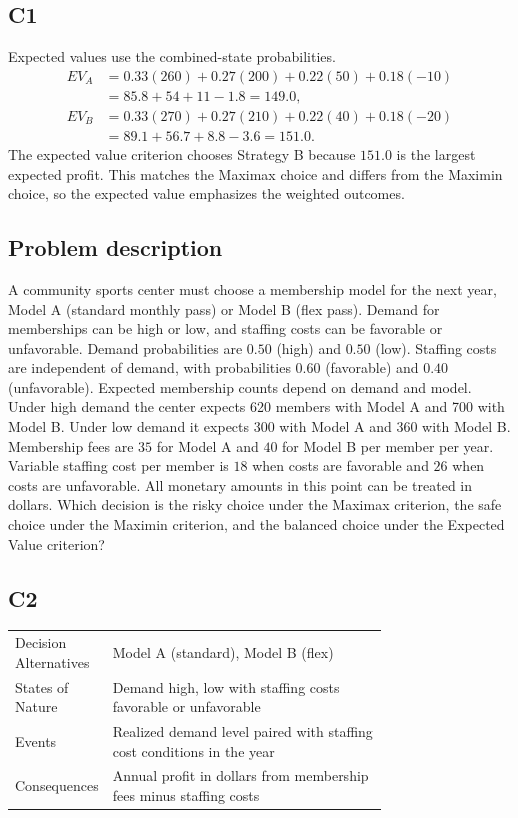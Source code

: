 \begin{ExamProblems}
		\subsection*{C1}
		Expected values use the combined-state probabilities.
		\[
		\begin{aligned}
		EV_A &= 0.33(260)+0.27(200)+0.22(50)+0.18(-10)\\
		&= 85.8+54+11-1.8=149.0,\\
		EV_B &= 0.33(270)+0.27(210)+0.22(40)+0.18(-20)\\
		&= 89.1+56.7+8.8-3.6=151.0.
		\end{aligned}
		\]
		The expected value criterion chooses Strategy B because $151.0$ is the largest expected profit. This matches the Maximax choice and differs from the Maximin choice, so the expected value emphasizes the weighted outcomes.

		\item
		\subsection*{Problem description}
		A community sports center must choose a membership model for the next year, Model A (standard monthly pass)
		or Model B (flex pass). Demand for memberships can be high or low, and staffing costs can be favorable or unfavorable. Demand probabilities are $0.50$ (high) and $0.50$ (low). Staffing costs are independent of demand, with probabilities $0.60$ (favorable) and $0.40$ (unfavorable). Expected membership counts depend on demand and model. Under high demand the center expects 620 members with Model A and 700 with Model B. Under low demand it expects 300 with Model A and 360 with Model B. Membership fees are $35$ for Model A and $40$ for Model B per member per year. Variable staffing cost per member is $18$ when costs are favorable and $26$ when costs are unfavorable. All monetary amounts in this point can be treated in dollars. Which decision is the risky choice under the Maximax criterion, the safe choice under the Maximin criterion, and the balanced choice under the Expected Value criterion?

		\subsection*{C2}
		\begin{center}
			\begin{tabular}{l p{0.74\linewidth}}
				\toprule
				Decision Alternatives & Model A (standard), Model B (flex) \\
				States of Nature & Demand high, low with staffing costs favorable or unfavorable \\
				Events & Realized demand level paired with staffing cost conditions in the year \\
				Consequences & Annual profit in dollars from membership fees minus staffing costs \\
				\bottomrule
			\end{tabular}
		\end{center}


\end{ExamProblems}
